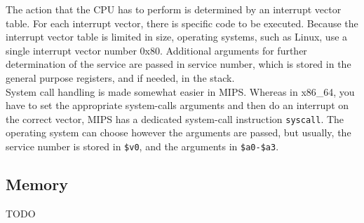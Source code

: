 The action that the CPU has to perform is determined by an interrupt vector
table. For each interrupt vector, there is specific code to be executed.
Because the interrupt vector table is limited in size, operating systems, such
as Linux, use a single interrupt vector number 0x80. Additional arguments for
further determination of the service are passed in service number, which is
stored in the general purpose registers, and if needed, in the stack.\\
System call handling is made somewhat easier in MIPS. Whereas in x86\_64, you
have to set the appropriate system-calls arguments and then do an interrupt on
the correct vector, MIPS has a dedicated system-call instruction
\texttt{syscall}. The operating system can choose however the arguments are
passed, but usually, the service number is stored in \texttt{\$v0}, and the
arguments in \texttt{\$a0-\$a3}\cite{COD5}.


\subsection{Memory}
TODO
